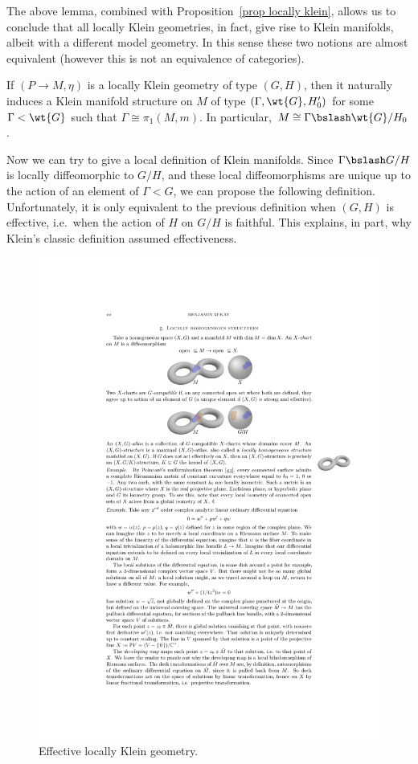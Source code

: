 The above lemma, combined with Proposition~\ref{prop locally klein}, allows us to conclude that all locally Klein geometries, in fact, give rise to Klein manifolds, albeit with a different model geometry. In this sense these two notions are almost equivalent (however this is not an equivalence of categories).
\begin{cor}
    If $(P\to M,\eta)$ is a locally Klein geometry of type $(G,H)$, then it naturally induces a Klein manifold structure on $M$ of type $(\Gamma,\wt{G},H'_0)$ for some $\Gamma<\wt{G}$ such that $\Gamma\cong\pi_1(M,m)$. In particular, $M\cong \Gamma\bslash \wt{G}\slash H_0$.
\end{cor}

Now we can try to give a local definition of Klein manifolds. Since $\Gamma\bslash G\slash H$ is locally diffeomorphic to $G\slash H$, and these local diffeomorphisms are unique up to the action of an element of $\Gamma<G$, we can propose the following definition. Unfortunately, it is only equivalent to the previous definition when $(G,H)$ is effective, i.e.\ when the action of $H$ on $G\slash H$ is faithful. This explains, in part, why Klein's classic definition assumed effectiveness.

\begin{figure}[tp]
    \centering
    \includegraphics[scale=1.2]{figures/Klein.pdf}
    \caption{Effective locally Klein geometry.}
    \label{fig:klein}
\end{figure}

